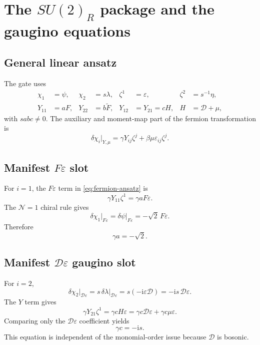 \documentclass[11pt,a4paper,UTF8]{ctexart}
\numberwithin{equation}{section}
\newcommand{\ii}{\mathrm i}
\newcommand{\eps}{\varepsilon}
\newcommand{\N}{\mathcal N}
\newcommand{\slot}{\big\vert}
\begin{document}
\section{The $SU(2)_R$ package and the gaugino equations}

\subsection{General linear ansatz}

The gate uses
\begin{align}
\chi_1&=\psi,
&\chi_2&=s\lambda,
&\zeta^1&=\eps,
&\zeta^2&=s^{-1}\eta,
\label{eq:general-doublet}
\\
Y_{11}&=aF,
&Y_{22}&=b\widetilde F,
&Y_{12}&=Y_{21}=cH,
& H&=\mathscr D+\mu,
\label{eq:general-triplet}
\end{align}
with $sabc\neq0$. The auxiliary and moment-map part of the fermion transformation is
\begin{equation}
\delta\chi_i\slot_{Y,\mu}
=\gamma Y_{ij}\zeta^j+\beta\mu\eps_{ij}\zeta^j.
\label{eq:fermion-ansatz}
\end{equation}

\subsection{Manifest $F\eps$ slot}

For $i=1$, the $F\eps$ term in \cref{eq:fermion-ansatz} is
\[
\gamma Y_{11}\zeta^1
=\gamma aF\eps.
\]
The $\N=1$ chiral rule gives
\[
\delta\chi_1\slot_{F\eps}
=\delta\psi\slot_{F\eps}
=-\sqrt2\,F\eps.
\]
Therefore
\begin{equation}
\boxed{\gamma a=-\sqrt2.}
\label{eq:gamma-a}
\end{equation}

\subsection{Manifest $\mathscr D\eps$ gaugino slot}

For $i=2$,
\[
\delta\chi_2\slot_{\mathscr D\eps}
=s\,\delta\lambda\slot_{\mathscr D\eps}
=s(-\ii\eps\mathscr D)
=-\ii s\,\mathscr D\eps.
\]
The $Y$ term gives
\[
\gamma Y_{21}\zeta^1
=\gamma cH\eps
=\gamma c\mathscr D\eps+\gamma c\mu\eps.
\]
Comparing only the $\mathscr D\eps$ coefficient yields
\begin{equation}
\boxed{\gamma c=-\ii s.}
\label{eq:gaugino-c}
\end{equation}
This equation is independent of the monomial-order issue because $\mathscr D$ is bosonic.
\end{document}
